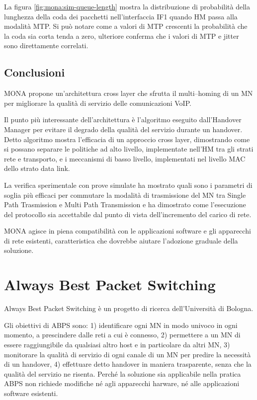 \documentclass[12pt,a4paper,openright,twoside]{book}
\begin{document}
La figura \ref{fig:mona:sim-queue-length} mostra la distribuzione di
probabilità della lunghezza della coda dei pacchetti nell'interfaccia
IF1 quando HM passa alla modalità MTP. Si può notare come a valori di
MTP crescenti la probabilità che la coda sia corta tenda a zero,
ulteriore conferma che i valori di MTP e jitter sono direttamente
correlati.

\section{Conclusioni}

MONA propone un'architettura cross layer che sfrutta il multi--homing
di un MN per migliorare la qualità di servizio delle comunicazioni
VoIP.

Il punto più interessante dell'architettura è l'algoritmo eseguito
dall'Handover Manager per evitare il degrado della qualità del
servizio durante un handover. Detto algoritmo mostra l'efficacia di un
approccio cross layer, dimostrando come si possano separare le
politiche ad alto livello, implementate nell'HM tra gli strati rete e
transporto, e i meccanismi di basso livello, implementati nel livello
MAC dello strato data link.

La verifica sperimentale con prove simulate ha mostrato quali sono i
parametri di soglia più efficaci per commutare la modalità di
trasmissione del MN tra Single Path Trasmission e Multi Path
Transmission e ha dimostrato come l'esecuzione del protocollo sia
accettabile dal punto di vista dell'incremento del carico di rete.

MONA agisce in piena compatibilità con le applicazioni software e gli
apparecchi di rete esistenti, caratteristica che dovrebbe aiutare
l'adozione graduale della soluzione.

\clearpage{\pagestyle{empty}\cleardoublepage}

\chapter{Always Best Packet Switching}
\label{cha:abps}

Always Best Packet Switching è un progetto di ricerca dell'Università
di Bologna.

Gli obiettivi di ABPS sono: 1) identificare ogni MN in modo univoco in
ogni momento, a prescindere dalle reti a cui è connesso, 2) permettere
a un MN di essere raggiungibile da qualsiasi altro host e in
particolare da altri MN, 3) monitorare la qualità di servizio di ogni
canale di un MN per predire la necessità di un handover, 4) effettuare
detto handover in maniera trasparente, senza che la qualità del
servizio ne risenta. Perché la soluzione sia applicabile nella pratica
ABPS non richiede modifiche né agli apparecchi harware, né alle
applicazioni software esistenti.
\end{document}
